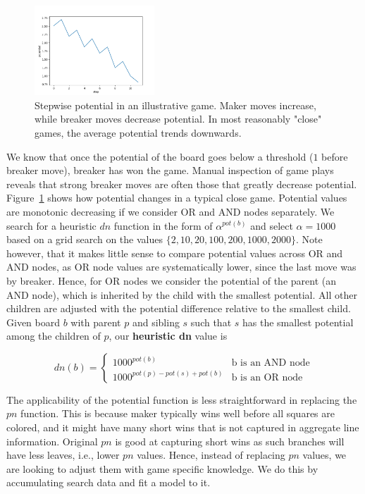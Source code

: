 \documentclass[conference]{IEEEtran}
\theoremstyle{definition}
\newcommand{\pn}{$pn$\xspace}
\newcommand{\dn}{$dn$\xspace}
\begin{document}
\begin{figure}
    \centering
    \includegraphics[width=0.4\textwidth]{figures/potential.png}
    \caption{Stepwise potential in an illustrative game. Maker moves increase, while breaker moves decrease potential. In most reasonably "close" games, the average potential trends downwards.}
    \label{fig:potential}
\end{figure}

We know that once the potential of the board goes below a threshold ($1$ before breaker move), breaker has won the game. Manual inspection of game plays reveals that strong breaker moves are often those that greatly decrease potential. Figure~\ref{fig:potential} shows how potential changes in a typical close game. Potential values are monotonic decreasing if we consider OR and AND nodes separately. We search for a heuristic \dn function in the form of $\alpha^{pot(b)}$ and select $\alpha = 1000$ based on a grid search on the values $\{2, 10, 20, 100, 200, 1000, 2000\}$. Note however, that it makes little sense to compare potential values across OR and AND nodes, as OR node values are systematically lower, since the last move was by breaker. Hence, for OR nodes we consider the potential of the parent (an AND node), which is inherited by the child with the smallest potential. All other children are adjusted with the potential difference relative to the smallest child. Given board $b$ with parent $p$ and sibling $s$ such that $s$ has the smallest potential among the children of $p$, our {\bf heuristic dn} value is 

$$
dn(b) = 
\left\{
	\begin{array}{ll}
		1000^{pot(b)} & \mbox{b is an AND node}\\
		1000^{pot(p) - pot(s) + pot(b)}  & \mbox{b is an OR node}
	\end{array}
\right.
$$

The applicability of the potential function is less straightforward in replacing the \pn function. This is because maker typically wins well before all squares are colored, and it might have many short wins that is not captured in aggregate line information. Original \pn is good at capturing short wins as such branches will have less leaves, i.e., lower \pn values. Hence, instead of replacing \pn values, we are looking to adjust them with game specific knowledge. We do this by accumulating search data and fit a model to it. 
\end{document}
